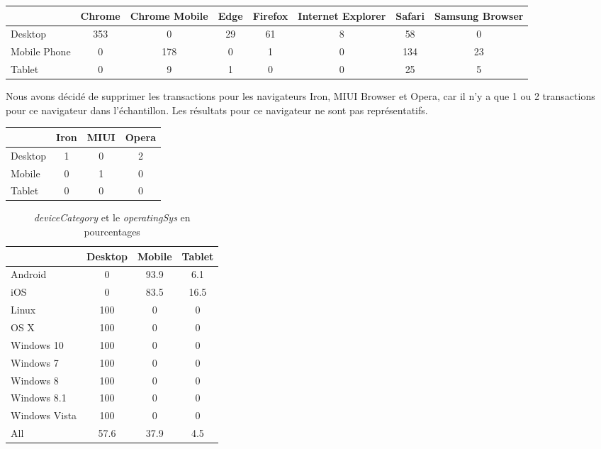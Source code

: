 \begin{table}[ht] 
\begin{adjustbox}{width=1\textwidth} 
\small 
\begin{tabular}{|l|c|c|c|c|c|c|c|} 
\hline 
& \multicolumn{1}{l|}{Chrome} & \multicolumn{1}{l|}{Chrome Mobile} & \multicolumn{1}{l|}{Edge}  & \multicolumn{1}{l|}{Firefox} & \multicolumn{1}{l|}{Internet Explorer} &  
\multicolumn{1}{l|}{Safari} & \multicolumn{1}{l|}{Samsung Browser} \\ \hline Desktop & 353 & 0 & 29 & 61 & 8 & 58 & 0 \\ \hline 
Mobile Phone & 0 & 178 & 0 & 1 & 0 & 134 & 23 \\ \hline 
Tablet & 0 & 9 & 1 & 0 & 0 & 25 & 5 \\ \hline 
\end{tabular} 
\end{adjustbox} 
\end{table} 
Nous avons décidé de supprimer les transactions pour les navigateurs Iron, MIUI Browser et Opera,  car il n'y a que 1 ou 2 transactions pour ce navigateur dans l’échantillon. Les résultats pour ce  navigateur ne sont pas représentatifs. 
\begin{table}[ht] 
\begin{adjustbox}{width=0.4\textwidth} 
\begin{tabular}{|l|c|c|c|} 
\hline 
& \multicolumn{1}{l|}{Iron} & \multicolumn{1}{l|}{MIUI} & \multicolumn{1}{l|}{Opera} \\ \hline Desktop & 1 & 0 & 2 \\ \hline 
Mobile & 0 & 1 & 0 \\ \hline
Tablet & 0 & 0 & 0 \\ \hline 
\end{tabular} 
\end{adjustbox} 
\end{table} 
\begin{table}[!hbtp] 
\caption{ \emph{deviceCategory} et le \emph{operatingSys} en pourcentages}  \begin{adjustbox}{width=0.6\textwidth} 
\begin{tabular}{|l|c|c|c|} 
\hline 
& \multicolumn{1}{l|}{Desktop} & \multicolumn{1}{l|}{Mobile} & \multicolumn{1}{l|}{Tablet} \\ \hline 
Android & 0 & 93.9 & 6.1 \\ \hline 
iOS & 0 & 83.5 & 16.5 \\ \hline 
Linux & 100 & 0 & 0 \\ \hline 
OS X & 100 & 0 & 0 \\ \hline 
Windows 10 & 100 & 0 & 0 \\ \hline 
Windows 7 & 100 & 0 & 0 \\ \hline 
Windows 8 & 100 & 0 & 0 \\ \hline 
Windows 8.1 & 100 & 0 & 0 \\ \hline 
Windows Vista & 100 & 0 & 0 \\ \hline 
All & 57.6 & 37.9 & 4.5 \\ \hline 
\end{tabular} 
\end{adjustbox} 
\label{table:deviceCategoryoperatingSys} 
\end{table} 
